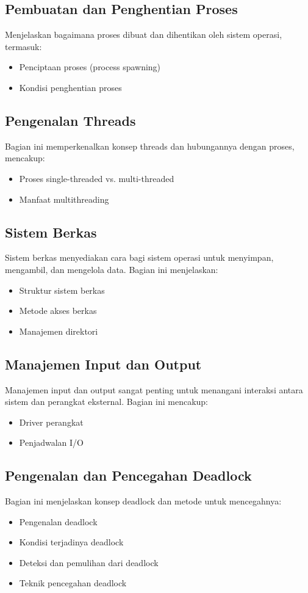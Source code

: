 \documentclass{article}
\begin{document}
\subsection{Pembuatan dan Penghentian Proses}
Menjelaskan bagaimana proses dibuat dan dihentikan oleh sistem operasi, termasuk:
\begin{itemize}
    \item Penciptaan proses (process spawning)
    \item Kondisi penghentian proses
\end{itemize}

\subsection{Pengenalan Threads}
Bagian ini memperkenalkan konsep threads dan hubungannya dengan proses, mencakup:
\begin{itemize}
    \item Proses single-threaded vs. multi-threaded
    \item Manfaat multithreading
\end{itemize}

\subsection{Sistem Berkas}
Sistem berkas menyediakan cara bagi sistem operasi untuk menyimpan, mengambil, dan mengelola data. Bagian ini menjelaskan:
\begin{itemize}
    \item Struktur sistem berkas
    \item Metode akses berkas
    \item Manajemen direktori
\end{itemize}

\subsection{Manajemen Input dan Output}
Manajemen input dan output sangat penting untuk menangani interaksi antara sistem dan perangkat eksternal. Bagian ini mencakup:
\begin{itemize}
    \item Driver perangkat
    \item Penjadwalan I/O
\end{itemize}

\subsection{Pengenalan dan Pencegahan Deadlock}
Bagian ini menjelaskan konsep deadlock dan metode untuk mencegahnya:
\begin{itemize}
    \item Pengenalan deadlock
    \item Kondisi terjadinya deadlock
    \item Deteksi dan pemulihan dari deadlock
    \item Teknik pencegahan deadlock
\end{itemize}
\end{document}

